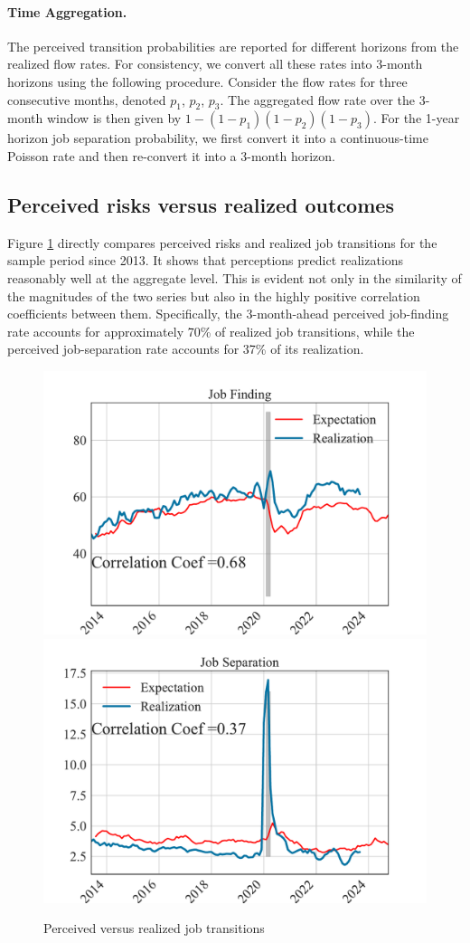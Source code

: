 \paragraph{Time Aggregation.} The perceived transition probabilities are reported for different horizons from the realized flow rates. For consistency, we convert all these rates into 3-month horizons using the following procedure. Consider the flow rates for three consecutive months, denoted $p_1$, $p_2$, $p_3$. The aggregated flow rate over the 3-month window is then given by $1- (1-p_1)(1-p_2)(1-p_3)$. For the 1-year horizon job separation probability, we first convert it into a continuous-time Poisson rate and then re-convert it into a 3-month horizon. 


\subsection{Perceived risks versus realized outcomes}
\label{subsec:comparison_simple}

Figure \ref{fig:simple_comparison} directly compares perceived risks and realized job transitions for the sample period since 2013. It shows that perceptions predict realizations reasonably well at the aggregate level. This is evident not only in the similarity of the magnitudes of the two series but also in the highly positive correlation coefficients between them. Specifically, the 3-month-ahead perceived job-finding rate accounts for approximately 70\% of realized job transitions, while the perceived job-separation rate accounts for 37\% of its realization. 

\begin{figure}[!ht] \centering  %
	\caption{Perceived versus realized job transitions} 
	\label{fig:simple_comparison}
\includegraphics[width=0.49\linewidth]{text/chapter2/Figures/expectation_realization_comparison_JF.pdf} 
\includegraphics[width=0.49\linewidth]{text/chapter2/Figures/expectation_realization_comparison_JS.pdf} 
\end{figure}


